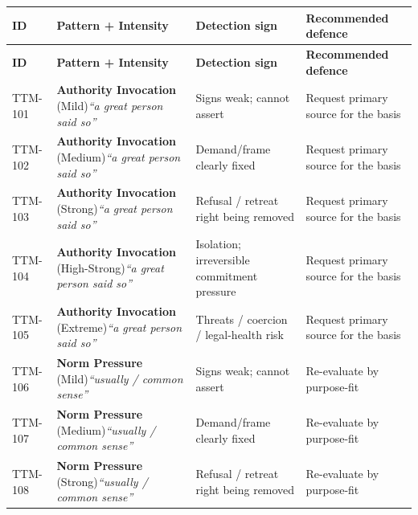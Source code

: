 \begin{small}
\begin{longtable}{@{}p{1.4cm}p{3.6cm}p{3.6cm}p{4.0cm}@{}}
\toprule
\textbf{ID} & \textbf{Pattern + Intensity} & \textbf{Detection sign} & \textbf{Recommended defence} \\
\midrule
\endfirsthead
\toprule
\textbf{ID} & \textbf{Pattern + Intensity} & \textbf{Detection sign} & \textbf{Recommended defence} \\
\midrule
\endhead
\bottomrule
\endfoot
TTM-101 & \textbf{Authority Invocation} (Mild)\newline\textit{\footnotesize ``a great person said so''} & Signs weak; cannot assert & Request primary source for the basis \\
\addlinespace[0.2em]
TTM-102 & \textbf{Authority Invocation} (Medium)\newline\textit{\footnotesize ``a great person said so''} & Demand/frame clearly fixed & Request primary source for the basis \\
\addlinespace[0.2em]
TTM-103 & \textbf{Authority Invocation} (Strong)\newline\textit{\footnotesize ``a great person said so''} & Refusal / retreat right being removed & Request primary source for the basis \\
\addlinespace[0.2em]
TTM-104 & \textbf{Authority Invocation} (High-Strong)\newline\textit{\footnotesize ``a great person said so''} & Isolation; irreversible commitment pressure & Request primary source for the basis \\
\addlinespace[0.2em]
TTM-105 & \textbf{Authority Invocation} (Extreme)\newline\textit{\footnotesize ``a great person said so''} & Threats / coercion / legal-health risk & Request primary source for the basis \\
\addlinespace[0.2em]
TTM-106 & \textbf{Norm Pressure} (Mild)\newline\textit{\footnotesize ``usually / common sense''} & Signs weak; cannot assert & Re-evaluate by purpose-fit \\
\addlinespace[0.2em]
TTM-107 & \textbf{Norm Pressure} (Medium)\newline\textit{\footnotesize ``usually / common sense''} & Demand/frame clearly fixed & Re-evaluate by purpose-fit \\
\addlinespace[0.2em]
TTM-108 & \textbf{Norm Pressure} (Strong)\newline\textit{\footnotesize ``usually / common sense''} & Refusal / retreat right being removed & Re-evaluate by purpose-fit \\

\end{longtable}
\end{small}
